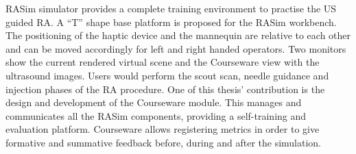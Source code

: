 \acs{RASim} simulator provides a complete training environment to practise the  \acs{US} guided \acs{RA}. A “T” shape base platform is proposed for the RASim workbench. The positioning of the haptic device and the mannequin are relative to each other and can be moved accordingly for left and right handed operators. Two monitors show the current rendered virtual scene and the \acs{Courseware} view with the ultrasound images. Users would perform the scout scan, needle guidance and injection phases of the \acs{RA} procedure. One of this thesis' contribution is the design and development of the \acs{Courseware} module. This manages and communicates all the \acs{RASim} components, providing a self-training and evaluation platform. \acs{Courseware} allows registering metrics in order to give formative and summative feedback before, during and after the simulation.





